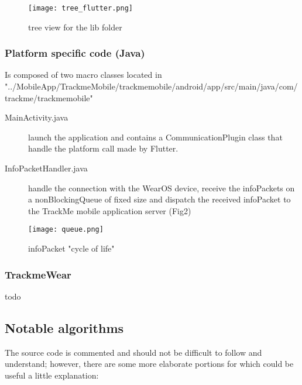 \documentclass[../main.tex]{subfiles}
\begin{document}
	\begin{figure}[H]
		\centering
		\texttt{[image: tree\_flutter.png]}
		\caption{tree view for the lib folder}
		\label{fig:lib_tree.png}
	\end{figure}

\subsubsection{Platform specific code (Java)}
Is composed of two macro classes located in \\ "../MobileApp/TrackmeMobile/trackmemobile/android/app/src/main/java/com/trackme/trackmemobile"
\begin{description}
	\item[MainActivity.java] launch the application and contains a CommunicationPlugin class that handle the platform call made by Flutter.
	\item[InfoPacketHandler.java] handle the connection with the WearOS device, receive the infoPackets on a nonBlockingQueue of fixed size and dispatch the received infoPacket to the TrackMe mobile application server (Fig2)
\end{description}

\begin{figure}[H]
	\centering
	\texttt{[image: queue.png]}
	\caption{infoPacket "cycle of life"}
	\label{fig:infopacketscycle.png}
\end{figure}

\subsubsection{TrackmeWear}

todo

\subsection{Notable algorithms}

The source code is commented and should not be difficult to follow and understand; however, there are some more elaborate portions for which could be useful a little explanation:
\end{document}
